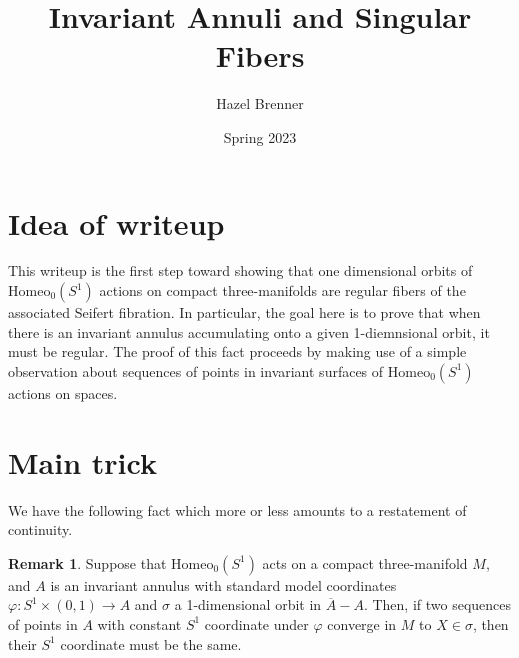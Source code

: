 \documentclass[10pt, oneside]{article}
\title{Invariant Annuli and Singular Fibers}
\author{Hazel Brenner}
\date{Spring 2023}
\newcommand{\homeoS}{\text{Homeo}_0(S^1)}
\newcommand{\cl}[1]{\overline{#1}}
\theoremstyle{definition}
\newtheorem{rem}{Remark}
\theoremstyle{definition}
\begin{document}
\maketitle

\section{Idea of writeup}

This writeup is the first step toward showing that one dimensional orbits of $\homeoS$ actions on compact three-manifolds are regular fibers of the associated Seifert fibration. In particular, the goal here is to prove that when there is an invariant annulus accumulating onto a given 1-diemnsional orbit, it must be regular. The proof of this fact proceeds by making use of a simple observation about sequences of points in invariant surfaces of $\homeoS$ actions on spaces. 

\section{Main trick}
We have the following fact which more or less amounts to a restatement of continuity.

\begin{rem}
    Suppose that $\homeoS$ acts on a compact three-manifold $M$, and $A$ is an invariant annulus with standard model coordinates $\varphi: S^1\times (0,1) \to A$ and $\sigma$ a 1-dimensional orbit in $\cl{A}- A$. Then, if two sequences of points in $A$ with constant $S^1$ coordinate under $\varphi$ converge in $M$ to $X\in\sigma$, then their $S^1$ coordinate must be the same.
\end{rem}

\listoftodos[Notes]
\end{document}
